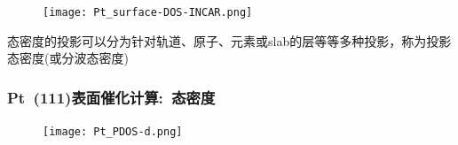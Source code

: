 {%
\begin{figure}[h!]
\centering
\texttt{[image: Pt\_surface-DOS-INCAR.png]}
\caption{\fontsize{6.2pt}{5.2pt}}%
\label{Pt_surface-DOS-INCAR}
\end{figure}
	态密度的投影可以分为针对轨道、原子、元素或\textrm{slab}的层等等多种投影，称为投影态密度(或分波态密度)%
}

\frame
{
	\frametitle{\textrm{Pt~(111)}表面催化计算:~态密度}
{\fontsize{8.5pt}{5.2pt}}
\begin{figure}[h!]
\centering
\texttt{[image: Pt\_PDOS-d.png]}
\caption{\fontsize{6.2pt}{5.2pt}}%
\label{Pt_PDOS-d}
\end{figure}
}

